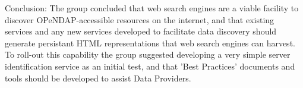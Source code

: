Conclusion:  The group concluded that web search engines are a viable
  facility to discover OPeNDAP-accessible resources on the internet,
  and that existing services and any new services developed to
  facilitate data discovery should generate persistant HTML representations
  that web search engines can harvest.   To roll-out this capability
  the group suggested developing a very simple server identification
  service as an initial test, and that 'Best Practices' documents and
  tools should be developed to assist Data Providers.


%
%
%
